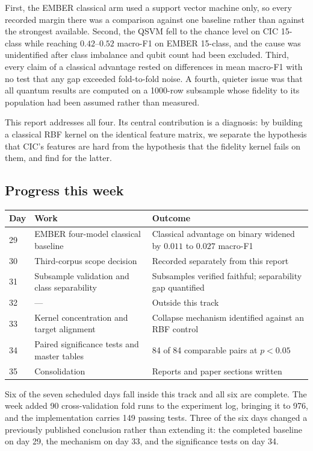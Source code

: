 \documentclass[11pt]{article}
\begin{document}
First, the EMBER classical arm used a support vector machine only, so every
recorded margin there was a comparison against one baseline rather than against
the strongest available. Second, the QSVM fell to the chance level on CIC
15-class while reaching $0.42$--$0.52$ macro-F1 on EMBER 15-class, and the cause
was unidentified after class imbalance and qubit count had been excluded. Third,
every claim of a classical advantage rested on differences in mean macro-F1 with
no test that any gap exceeded fold-to-fold noise. A fourth, quieter issue was
that all quantum results are computed on a 1000-row subsample whose fidelity to
its population had been assumed rather than measured.

This report addresses all four. Its central contribution is a diagnosis: by
building a classical RBF kernel on the identical feature matrix, we separate the
hypothesis that CIC's features are hard from the hypothesis that the fidelity
kernel fails on them, and find for the latter.

\subsection*{Progress this week}

\begin{center}
\small
\begin{tabular}{@{}llp{}@{}}
\toprule
\textbf{Day} & \textbf{Work} & \textbf{Outcome} \\
\midrule
29 & EMBER four-model classical baseline
   & Classical advantage on binary widened by $0.011$ to $0.027$ macro-F1 \\
30 & Third-corpus scope decision
   & Recorded separately from this report \\
31 & Subsample validation and class separability
   & Subsamples verified faithful; separability gap quantified \\
32 & ---
   & Outside this track \\
33 & Kernel concentration and target alignment
   & Collapse mechanism identified against an RBF control \\
34 & Paired significance tests and master tables
   & 84 of 84 comparable pairs at $p<0.05$ \\
35 & Consolidation
   & Reports and paper sections written \\
\bottomrule
\end{tabular}
\end{center}

Six of the seven scheduled days fall inside this track and all six are complete.
The week added 90 cross-validation fold runs to the experiment log, bringing it
to 976, and the implementation carries 149 passing tests. Three of the six days
changed a previously published conclusion rather than extending it: the
completed baseline on day 29, the mechanism on day 33, and the significance
tests on day 34.
\end{document}
